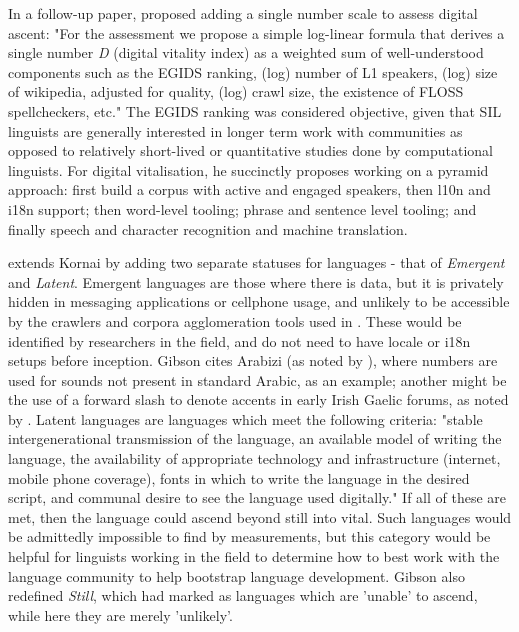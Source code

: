 In a follow-up paper, \citep{kornai2015new} proposed adding a single number scale to assess digital ascent: "For the assessment we propose a simple log-linear formula that derives a single number {\emph D} (digital vitality index) as a weighted sum of well-understood components such as the EGIDS ranking, (log) number of L1 speakers, (log) size of wikipedia, adjusted for quality, (log) crawl size, the existence of FLOSS spellcheckers, etc." The EGIDS ranking was considered objective, given that SIL linguists are generally interested in longer term work with communities as opposed to relatively short-lived or quantitative studies done by computational linguists. For digital vitalisation, he succinctly proposes working on a pyramid approach: first build a corpus with active and engaged speakers, then l10n and i18n support; then word-level tooling; phrase and sentence level tooling; and finally speech and character recognition and machine translation.

\citet{gibson2016assessing} extends Kornai by adding two separate statuses for languages - that of {\it Emergent} and {\it Latent}. Emergent languages are those where there is data, but it is privately hidden in messaging applications or cellphone usage, and unlikely to be accessible by the crawlers and corpora agglomeration tools used in \citet{kornai2013digital}. These would be identified by researchers in the field, and do not need to have locale or i18n setups before inception. Gibson cites Arabizi (as noted by \citet{darwish2013arabizi}), where numbers are used for sounds not present in standard Arabic, as an example; another might be the use of a forward slash to denote accents in early Irish Gaelic forums, as noted by \citet{scannell2007crubadan}. Latent languages are languages which meet the following criteria: "stable intergenerational transmission of the language, an available model of writing the language, the availability of appropriate technology and infrastructure (internet, mobile phone coverage), fonts in which to write the language in the desired script, and communal desire to see the language used digitally." If all of these are met, then the language could ascend beyond still into vital. Such languages would be admittedly impossible to find by measurements, but this category would be helpful for linguists working in the field to determine how to best work with the language community to help bootstrap language development. Gibson also redefined {\it Still}, which \citet{kornai2013digital} had marked as languages which are 'unable' to ascend, while here they are merely 'unlikely'.

